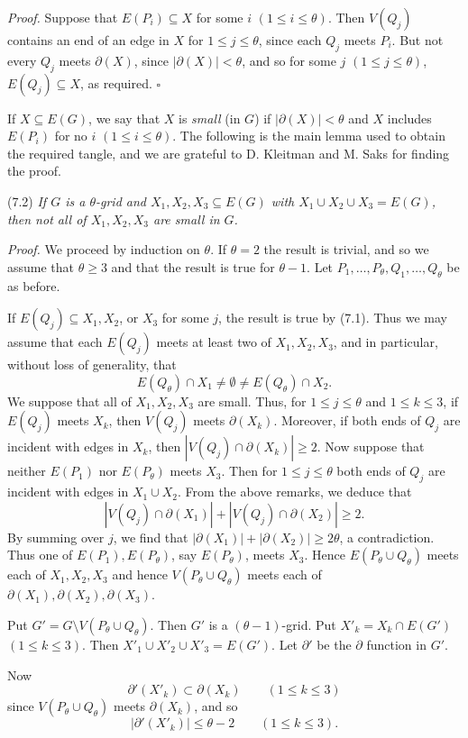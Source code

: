 \textit{Proof.} Suppose that $E(P_i) \subseteq X$ for some $i$ $(1 \le i \le \theta)$. Then $V(Q_j)$ contains an end of an edge in $X$ for $1 \le j \le \theta$, since each $Q_j$ meets $P_i$. But not every $Q_j$ meets $\partial(X)$, since $|\partial(X)| < \theta$, and so for some $j$ $(1 \le j \le \theta)$, $E(Q_j) \subseteq X$, as required. $\square$

If $X \subseteq E(G)$, we say that $X$ is \textit{small} (in $G$) if $|\partial(X)| < \theta$ and $X$ includes $E(P_i)$ for no $i$ $(1 \le i \le \theta)$. The following is the main lemma used to obtain the required tangle, and we are grateful to D. Kleitman and M. Saks for finding the proof.

\stmt
(7.2) \textit{If $G$ is a $\theta$-grid and $X_1, X_2, X_3 \subseteq E(G)$ with $X_1 \cup X_2 \cup X_3 = E(G)$, then not all of $X_1, X_2, X_3$ are small in $G$.}

\textit{Proof.} We proceed by induction on $\theta$. If $\theta = 2$ the result is trivial, and so we assume that $\theta \ge 3$ and that the result is true for $\theta - 1$. Let $P_1, \dots, P_\theta, Q_1, \dots, Q_\theta$ be as before.

If $E(Q_j) \subseteq X_1, X_2$, or $X_3$ for some $j$, the result is true by (7.1). Thus we may assume that each $E(Q_j)$ meets at least two of $X_1, X_2, X_3$, and in particular, without loss of generality, that
\begin{equation*}
E(Q_\theta) \cap X_1 \ne \emptyset \ne E(Q_\theta) \cap X_2.
\end{equation*}
We suppose that all of $X_1, X_2, X_3$ are small. Thus, for $1 \le j \le \theta$ and $1 \le k \le 3$, if $E(Q_j)$ meets $X_k$, then $V(Q_j)$ meets $\partial(X_k)$. Moreover, if both ends of $Q_j$ are incident with edges in $X_k$, then $|V(Q_j) \cap \partial(X_k)| \ge 2$. Now suppose that neither $E(P_1)$ nor $E(P_\theta)$ meets $X_3$. Then for $1 \le j \le \theta$ both ends of $Q_j$ are incident with edges in $X_1 \cup X_2$. From the above remarks, we deduce that
\begin{equation*}
|V(Q_j) \cap \partial(X_1)| + |V(Q_j) \cap \partial(X_2)| \ge 2.
\end{equation*}
By summing over $j$, we find that $|\partial(X_1)| + |\partial(X_2)| \ge 2\theta$, a contradiction. Thus one of $E(P_1), E(P_\theta)$, say $E(P_\theta)$, meets $X_3$. Hence $E(P_\theta \cup Q_\theta)$ meets each of $X_1, X_2, X_3$ and hence $V(P_\theta \cup Q_\theta)$ meets each of $\partial(X_1), \partial(X_2), \partial(X_3)$.

Put $G' = G \setminus V(P_\theta \cup Q_\theta)$. Then $G'$ is a $(\theta - 1)$-grid. Put $X'_k = X_k \cap E(G')$ $(1 \le k \le 3)$. Then $X'_1 \cup X'_2 \cup X'_3 = E(G')$. Let $\partial'$ be the $\partial$ function in $G'$.

Now
\begin{equation*}
\partial'(X'_k) \subset \partial(X_k) \qquad (1 \le k \le 3)
\end{equation*}
since $V(P_\theta \cup Q_\theta)$ meets $\partial(X_k)$, and so
\begin{equation*}
|\partial'(X'_k)| \le \theta - 2 \qquad (1 \le k \le 3).
\end{equation*}
